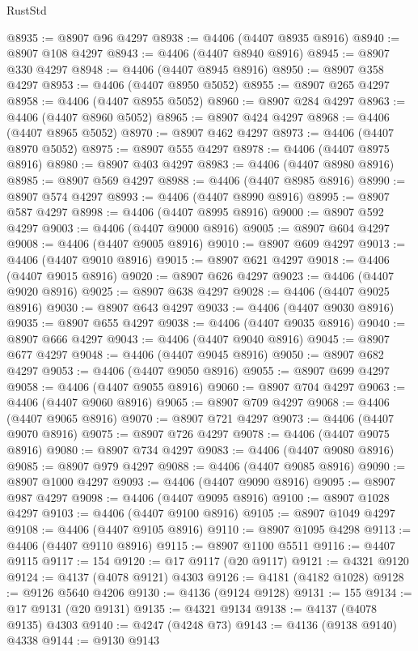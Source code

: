 \begin{lexlean}{RustStd}
\begin{coremodule}
@8935 := @8907 @96 @4297
@8938 := @4406 (@4407 @8935 @8916)
@8940 := @8907 @108 @4297
@8943 := @4406 (@4407 @8940 @8916)
@8945 := @8907 @330 @4297
@8948 := @4406 (@4407 @8945 @8916)
@8950 := @8907 @358 @4297
@8953 := @4406 (@4407 @8950 @5052)
@8955 := @8907 @265 @4297
@8958 := @4406 (@4407 @8955 @5052)
@8960 := @8907 @284 @4297
@8963 := @4406 (@4407 @8960 @5052)
@8965 := @8907 @424 @4297
@8968 := @4406 (@4407 @8965 @5052)
@8970 := @8907 @462 @4297
@8973 := @4406 (@4407 @8970 @5052)
@8975 := @8907 @555 @4297
@8978 := @4406 (@4407 @8975 @8916)
@8980 := @8907 @403 @4297
@8983 := @4406 (@4407 @8980 @8916)
@8985 := @8907 @569 @4297
@8988 := @4406 (@4407 @8985 @8916)
@8990 := @8907 @574 @4297
@8993 := @4406 (@4407 @8990 @8916)
@8995 := @8907 @587 @4297
@8998 := @4406 (@4407 @8995 @8916)
@9000 := @8907 @592 @4297
@9003 := @4406 (@4407 @9000 @8916)
@9005 := @8907 @604 @4297
@9008 := @4406 (@4407 @9005 @8916)
@9010 := @8907 @609 @4297
@9013 := @4406 (@4407 @9010 @8916)
@9015 := @8907 @621 @4297
@9018 := @4406 (@4407 @9015 @8916)
@9020 := @8907 @626 @4297
@9023 := @4406 (@4407 @9020 @8916)
@9025 := @8907 @638 @4297
@9028 := @4406 (@4407 @9025 @8916)
@9030 := @8907 @643 @4297
@9033 := @4406 (@4407 @9030 @8916)
@9035 := @8907 @655 @4297
@9038 := @4406 (@4407 @9035 @8916)
@9040 := @8907 @666 @4297
@9043 := @4406 (@4407 @9040 @8916)
@9045 := @8907 @677 @4297
@9048 := @4406 (@4407 @9045 @8916)
@9050 := @8907 @682 @4297
@9053 := @4406 (@4407 @9050 @8916)
@9055 := @8907 @699 @4297
@9058 := @4406 (@4407 @9055 @8916)
@9060 := @8907 @704 @4297
@9063 := @4406 (@4407 @9060 @8916)
@9065 := @8907 @709 @4297
@9068 := @4406 (@4407 @9065 @8916)
@9070 := @8907 @721 @4297
@9073 := @4406 (@4407 @9070 @8916)
@9075 := @8907 @726 @4297
@9078 := @4406 (@4407 @9075 @8916)
@9080 := @8907 @734 @4297
@9083 := @4406 (@4407 @9080 @8916)
@9085 := @8907 @979 @4297
@9088 := @4406 (@4407 @9085 @8916)
@9090 := @8907 @1000 @4297
@9093 := @4406 (@4407 @9090 @8916)
@9095 := @8907 @987 @4297
@9098 := @4406 (@4407 @9095 @8916)
@9100 := @8907 @1028 @4297
@9103 := @4406 (@4407 @9100 @8916)
@9105 := @8907 @1049 @4297
@9108 := @4406 (@4407 @9105 @8916)
@9110 := @8907 @1095 @4298
@9113 := @4406 (@4407 @9110 @8916)
@9115 := @8907 @1100 @5511
@9116 := @4407 @9115
@9117 := 154
@9120 := @17 @9117 (@20 @9117)
@9121 := @4321 @9120
@9124 := @4137 (@4078 @9121) @4303
@9126 := @4181 (@4182 @1028)
@9128 := @9126 @5640 @4206
@9130 := @4136 (@9124 @9128)
@9131 := 155
@9134 := @17 @9131 (@20 @9131)
@9135 := @4321 @9134
@9138 := @4137 (@4078 @9135) @4303
@9140 := @4247 (@4248 @73)
@9143 := @4136 (@9138 @9140) @4338
@9144 := @9130 @9143

\end{coremodule}
\end{lexlean}
